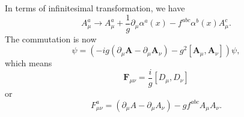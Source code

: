 \documentclass{report}
\numberwithin{equation}{section}
\begin{document}
In terms of infinitesimal transformation, we have
\begin{equation}
A_\mu^a \rightarrow A_\mu^a + \frac{1}{g}\partial_\mu \alpha^a(x)- f^{abc} \alpha^b(x)A_\mu^c.
\end{equation}
The commutation is now
\begin{equation}
[D_\mu,D_\nu]\psi=(-ig (\partial_\mu\textbf{A}-\partial_\mu\textbf{A}_\nu)-g^2[\textbf{A}_\mu,\textbf{A}_\nu])\psi,
\end{equation}
which means
\begin{equation}
\textbf{F}_{\mu\nu}=\frac{i}{g} [D_\mu,D_\nu]
\end{equation}
or
\begin{equation}
F_{\mu\nu}^a=(\partial_\mu A-\partial_\mu A_\nu)-gf^{abc}A_\mu A_\nu.
\end{equation}
\end{document}
